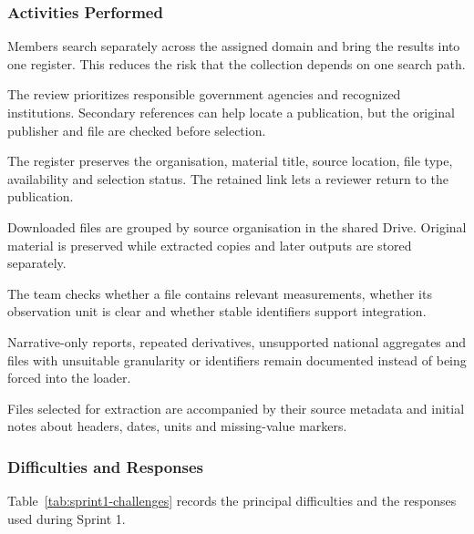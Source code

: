 \subsubsection{Activities Performed}

\begin{description}[style=nextline]
  \item[Independent source searching.] Members search separately across the
  assigned domain and bring the results into one register. This reduces the
  risk that the collection depends on one search path.
  \item[Official-source checking.] The review prioritizes responsible
  government agencies and recognized institutions. Secondary references can
  help locate a publication, but the original publisher and file are checked
  before selection.
  \item[Source recording.] The register preserves the organisation, material
  title, source location, file type, availability and selection status. The
  retained link lets a reviewer return to the publication.
  \item[Collection and organisation.] Downloaded files are grouped by source
  organisation in the shared Drive. Original material is preserved while
  extracted copies and later outputs are stored separately.
  \item[Scope and structure screening.] The team checks whether a file contains
  relevant measurements, whether its observation unit is clear and whether
  stable identifiers support integration.
  \item[Exclusion recording.] Narrative-only reports, repeated derivatives,
  unsupported national aggregates and files with unsuitable granularity or
  identifiers remain documented instead of being forced into the loader.
  \item[Handoff preparation.] Files selected for extraction are accompanied by
  their source metadata and initial notes about headers, dates, units and
  missing-value markers.
\end{description}

\subsubsection{Difficulties and Responses}

Table~\ref{tab:sprint1-challenges} records the principal difficulties and the
responses used during Sprint 1.

